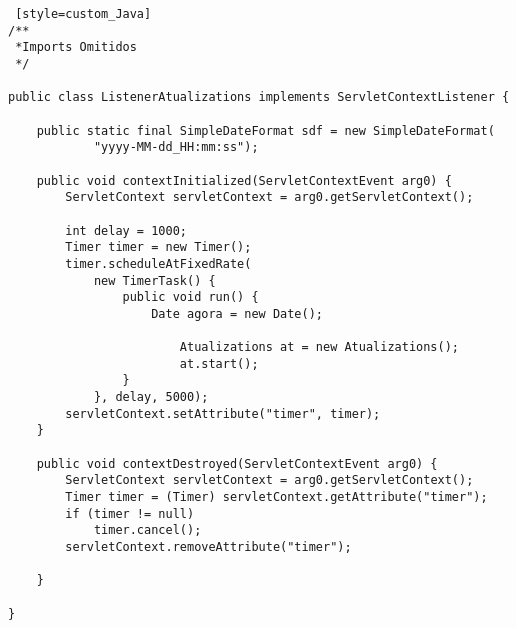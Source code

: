\begin{lstlisting} [style=custom_Java] 	
/**
 *Imports Omitidos
 */

public class ListenerAtualizations implements ServletContextListener {

	public static final SimpleDateFormat sdf = new SimpleDateFormat(
			"yyyy-MM-dd_HH:mm:ss");

	public void contextInitialized(ServletContextEvent arg0) {
		ServletContext servletContext = arg0.getServletContext();

		int delay = 1000;
		Timer timer = new Timer();
		timer.scheduleAtFixedRate(
			new TimerTask() {
				public void run() {
					Date agora = new Date();

						Atualizations at = new Atualizations();
						at.start();
				}
			}, delay, 5000);
		servletContext.setAttribute("timer", timer);
	}

	public void contextDestroyed(ServletContextEvent arg0) {
		ServletContext servletContext = arg0.getServletContext();
		Timer timer = (Timer) servletContext.getAttribute("timer");
		if (timer != null)
			timer.cancel();
		servletContext.removeAttribute("timer");

	}

}
	
\end{lstlisting}

